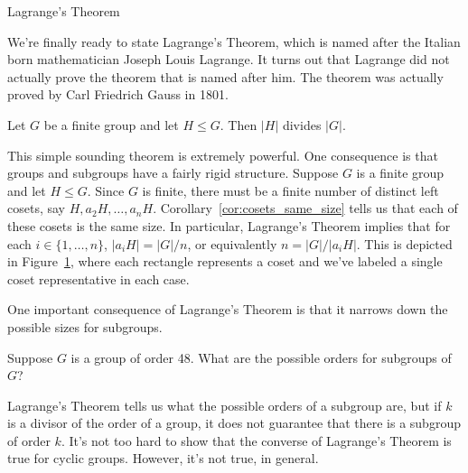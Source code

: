 \begin{section}{Lagrange's Theorem}

We're finally ready to state Lagrange's Theorem, which is named after the Italian born mathematician Joseph Louis Lagrange.  It turns out that Lagrange did not actually prove the theorem that is named after him.  The theorem was actually proved by Carl Friedrich Gauss in 1801.

\begin{theorem}
Let $G$ be a finite group and let $H\leq G$.  Then $|H|$ divides $|G|$.
\end{theorem}

This simple sounding theorem is extremely powerful.  One consequence is that groups and subgroups have a fairly rigid structure.  Suppose $G$ is a finite group and let $H\leq G$.  Since $G$ is finite, there must be a finite number of distinct left cosets, say $H, a_2H, \ldots, a_{n}H$.  Corollary~\ref{cor:cosets_same_size} tells us that each of these cosets is the same size.  In particular, Lagrange's Theorem implies that for each $i\in\{1,\ldots, n\}$, $|a_iH|=|G|/n$, or equivalently $n=|G|/|a_iH|$.  This is depicted in Figure~\ref{fig:Lagrange}, where each rectangle represents a coset and we've labeled a single coset representative in each case.

\begin{figure}[!ht]
\centering
{}
\caption{}
\label{fig:Lagrange}
\end{figure}

One important consequence of Lagrange's Theorem is that it narrows down the possible sizes for subgroups.

\begin{problem}
Suppose $G$ is a group of order 48.  What are the possible orders for subgroups of $G$?  
\end{problem}

Lagrange's Theorem tells us what the possible orders of a subgroup are, but if $k$ is a divisor of the order of a group, it does not guarantee that there is a subgroup of order $k$. It's not too hard to show that the converse of Lagrange's Theorem is true for cyclic groups.  However, it's not true, in general.  


\end{section}
